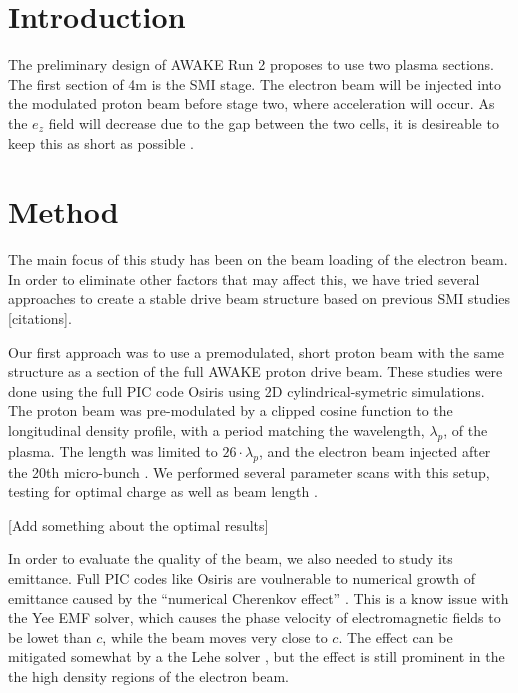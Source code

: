\documentclass[aps,prstab,reprint,amsmath,amssymb,groupedaddress]{revtex4-1}
\begin{document}
\section[\label{S:I}]{Introduction}


The preliminary design of AWAKE Run 2 proposes to use two plasma sections. The first section of 4m is the SMI stage. The
electron beam will be injected into the modulated proton beam before stage two, where acceleration will occur. As the
$e_z$ field will decrease due to the gap between the two cells, it is desireable to keep this as short as possible
\cite{adli:2016}.

\section[\label{S:M}]{Method}

The main focus of this study has been on the beam loading of the electron beam. In order to eliminate other factors that
may affect this, we have tried several approaches to create a stable drive beam structure based on previous SMI studies
[citations].

Our first approach was to use a premodulated, short proton beam with the same structure as a section of the full AWAKE
proton drive beam. These studies were done using the full PIC code Osiris \cite{fonseca:2002} using 2D
cylindrical-symetric simulations. The proton beam was pre-modulated by a clipped cosine function to the longitudinal
density profile, with a period matching the wavelength, $\lambda_p$, of the plasma. The length was limited to
$26\cdot\lambda_p$, and the electron beam injected after the 20th micro-bunch \cite{berglyd_olsen:2015}. We performed
several parameter scans with this setup, testing for optimal charge as well as beam length
\cite{adli:2016, berglyd_olsen:2016}.

[Add something about the optimal results]

In order to evaluate the quality of the beam, we also needed to study its emittance. Full PIC codes like Osiris are
voulnerable to numerical growth of emittance caused by the ``numerical Cherenkov effect'' \cite{godfrey:1974}. This is a
know issue with the Yee EMF solver, which causes the phase velocity of electromagnetic fields to be lowet than $c$,
while the beam moves very close to $c$. The effect can be mitigated somewhat by a the Lehe solver \cite{lehe:2013}, but
the effect is still prominent in the the high density regions of the electron beam.
\end{document}
